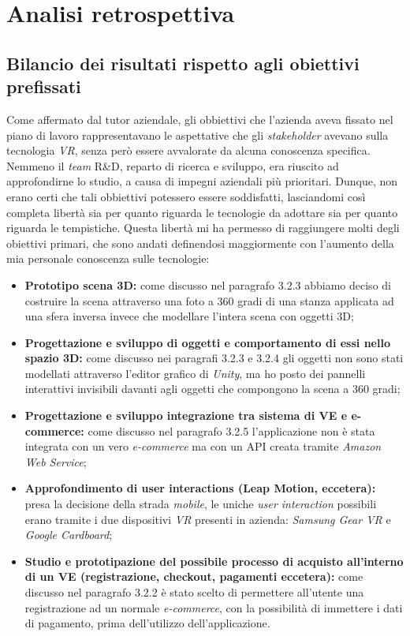 \newpage
\chapter{Analisi retrospettiva}
\label{cap:analisiretrospettiva}

\section{Bilancio dei risultati rispetto agli obiettivi prefissati}

Come affermato dal tutor aziendale, gli obbiettivi che l'azienda aveva fissato nel piano di lavoro rappresentavano le aspettative che gli \textit{stakeholder}\hyperlink{sh}{} avevano sulla tecnologia \textit{VR}, senza però essere avvalorate da alcuna conoscenza specifica. Nemmeno il \textit{team} R\&D, reparto di ricerca e sviluppo, era riuscito ad approfondirne lo studio, a causa di impegni aziendali più prioritari. Dunque, non erano certi che tali obbiettivi potessero essere soddisfatti, lasciandomi così completa libertà sia per quanto riguarda le tecnologie da adottare sia per quanto riguarda le tempistiche. Questa libertà mi ha permesso di raggiungere molti degli obiettivi primari, che sono andati definendosi maggiormente con l'aumento della mia personale conoscenza sulle tecnologie:
\begin{itemize}
	\item \textbf{Prototipo scena 3D:} come discusso nel paragrafo 3.2.3 abbiamo deciso di costruire la scena attraverso una foto a 360 gradi di una stanza applicata ad una sfera inversa invece che modellare l'intera scena con oggetti 3D;
	\item \textbf{Progettazione e sviluppo di oggetti e comportamento di essi nello spazio 3D:} come discusso nei paragrafi 3.2.3 e 3.2.4 gli oggetti non sono stati modellati attraverso l'editor grafico di \textit{Unity}, ma ho posto dei pannelli interattivi invisibili davanti agli oggetti che compongono la scena a 360 gradi;
	\item \textbf{Progettazione e sviluppo integrazione tra sistema di VE e e-commerce:} come discusso nel paragrafo 3.2.5 l'applicazione non è stata integrata con un vero \textit{e-commerce} ma con un API creata tramite \textit{Amazon Web Service};
	\item \textbf{Approfondimento di user interactions (Leap Motion, eccetera):} presa la decisione della strada \textit{mobile}, le uniche \textit{user interaction} possibili erano tramite i due dispositivi \textit{VR} presenti in azienda: \textit{Samsung Gear VR} e \textit{Google Cardboard};
	\item \textbf{Studio e prototipazione del possibile processo di acquisto all’interno di un VE (registrazione, checkout, pagamenti eccetera):} come discusso nel paragrafo 3.2.2 è stato scelto di permettere all'utente una registrazione ad un normale \textit{e-commerce}, con la possibilità di immettere i dati di pagamento, prima dell'utilizzo dell'applicazione.
\end{itemize} 

